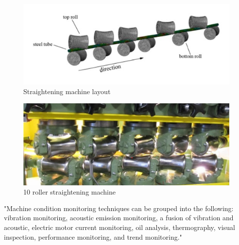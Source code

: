 \documentclass[]{article}
\begin{document}

\begin{figure}[H]
	\centering
	\includegraphics[width=\textwidth]{straightening3.jpg}
	\caption{Straightening machine layout~\cite{ma2021analysis}}
	\label{straighteningImage3}
\end{figure}


\begin{figure}[H]
	\centering
	\includegraphics[width=\textwidth, keepaspectratio]{Straightening6.png}
	\caption{10 roller straightening machine~\cite{zhang2019modeling}}
	\label{straighteningImage6}
\end{figure}

"Machine condition monitoring techniques can be grouped into the following: vibration monitoring, acoustic emission monitoring, a fusion of vibration and acoustic, electric motor current monitoring, oil analysis, thermography, visual inspection, performance monitoring, and trend monitoring."
\end{document}
